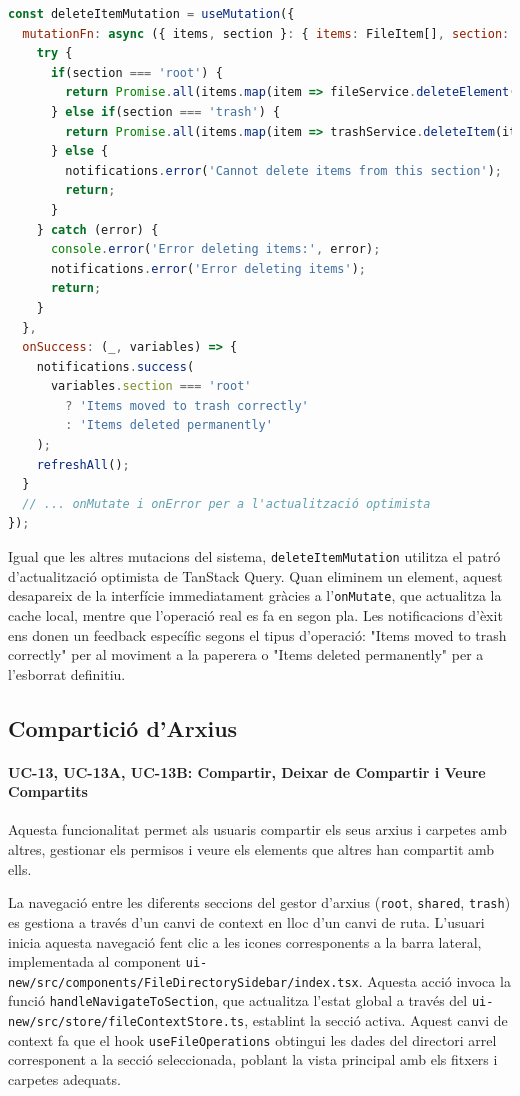\begin{lstlisting}[language=javascript, caption={Lògica dual de la mutació d'eliminació a `useFileOperations.ts`}]
const deleteItemMutation = useMutation({
  mutationFn: async ({ items, section }: { items: FileItem[], section: 'root' | 'trash' | 'shared' }) => {
    try {
      if(section === 'root') {
        return Promise.all(items.map(item => fileService.deleteElement(item.id!.toString())));
      } else if(section === 'trash') {
        return Promise.all(items.map(item => trashService.deleteItem(item.id!.toString())));
      } else {
        notifications.error('Cannot delete items from this section');
        return;
      }
    } catch (error) {
      console.error('Error deleting items:', error);
      notifications.error('Error deleting items');
      return;
    }
  },
  onSuccess: (_, variables) => {
    notifications.success(
      variables.section === 'root' 
        ? 'Items moved to trash correctly'
        : 'Items deleted permanently'
    );
    refreshAll();
  }
  // ... onMutate i onError per a l'actualització optimista
});
\end{lstlisting}

Igual que les altres mutacions del sistema, \texttt{deleteItemMutation} utilitza el patró d'actualització optimista de TanStack Query. Quan eliminem un element, aquest desapareix de la interfície immediatament gràcies a l'\texttt{onMutate}, que actualitza la cache local, mentre que l'operació real es fa en segon pla. Les notificacions d'èxit ens donen un feedback específic segons el tipus d'operació: "Items moved to trash correctly" per al moviment a la paperera o "Items deleted permanently" per a l'esborrat definitiu.

\subsection{Compartició d'Arxius}
\paragraph{UC-13, UC-13A, UC-13B: Compartir, Deixar de Compartir i Veure Compartits}
Aquesta funcionalitat permet als usuaris compartir els seus arxius i carpetes amb altres, gestionar els permisos i veure els elements que altres han compartit amb ells.

La navegació entre les diferents seccions del gestor d'arxius (\texttt{root}, \texttt{shared}, \texttt{trash}) es gestiona a través d'un canvi de context en lloc d'un canvi de ruta. L'usuari inicia aquesta navegació fent clic a les icones corresponents a la barra lateral, implementada al component \texttt{ui-new/src/components/FileDirectorySidebar/index.tsx}. Aquesta acció invoca la funció \texttt{handleNavigateToSection}, que actualitza l'estat global a través del \texttt{ui-new/src/store/fileContextStore.ts}, establint la secció activa. Aquest canvi de context fa que el hook \texttt{useFileOperations} obtingui les dades del directori arrel corresponent a la secció seleccionada, poblant la vista principal amb els fitxers i carpetes adequats.

